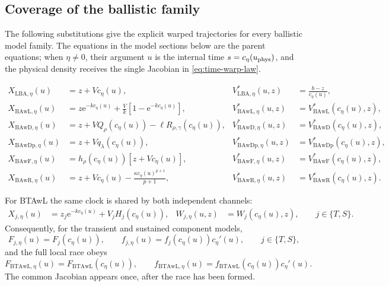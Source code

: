 \documentclass[12pt]{article}
\newcommand{\e}{\mathrm{e}}
\theoremstyle{remark}
\begin{document}
\subsection{Coverage of the ballistic family}
The following substitutions give the explicit warped trajectories for every ballistic model family. The equations in the model sections below are the parent equations; when \(\eta\ne0\), their argument \(u\) is the internal time \(s=c_\eta(u_{\rm phys})\), and the physical density receives the single Jacobian in \eqref{eq:time-warp-law}.

\begin{align}
 X_{\mathrm{LBA},\eta}(u)&=z+V c_\eta(u),
 &V_{\mathrm{LBA},\eta}^*(u,z)&=\frac{b-z}{c_\eta(u)},
 \label{eq:time-warp-lba}\\
 X_{\mathrm{BAwL},\eta}(u)&=z\e^{-kc_\eta(u)}
       +\frac{V}{k}\left[1-\e^{-kc_\eta(u)}\right],
 &V_{\mathrm{BAwL},\eta}^*(u,z)&=
       V_{\mathrm{BAwL}}^*(c_\eta(u),z),
 \label{eq:time-warp-bawl}\\
 X_{\mathrm{BAwD},\eta}(u)&=z+VQ_\rho(c_\eta(u))
       -\ell R_{\rho,\gamma}(c_\eta(u)),
 &V_{\mathrm{BAwD},\eta}^*(u,z)&=
       V_{\mathrm{BAwD}}^*(c_\eta(u),z),
 \label{eq:time-warp-bawd}\\
 X_{\mathrm{BAwDp},\eta}(u)&=z+Vq_\lambda(c_\eta(u)),
 &V_{\mathrm{BAwDp},\eta}^*(u,z)&=
       V_{\mathrm{BAwDp}}^*(c_\eta(u),z),
 \label{eq:time-warp-bawdp}\\
 X_{\mathrm{BAwF},\eta}(u)&=h_\rho(c_\eta(u))
       \left[z+Vc_\eta(u)\right],
 &V_{\mathrm{BAwF},\eta}^*(u,z)&=
       V_{\mathrm{BAwF}}^*(c_\eta(u),z),
 \label{eq:time-warp-bawf}\\
 X_{\mathrm{BAwR},\eta}(u)&=z+Vc_\eta(u)
       -\frac{\kappa c_\eta(u)^{p+1}}{p+1},
 &V_{\mathrm{BAwR},\eta}^*(u,z)&=
       V_{\mathrm{BAwR}}^*(c_\eta(u),z).
 \label{eq:time-warp-bawr}
\end{align}

For BTAwL the same clock is shared by both independent channels:
\begin{align}
 X_{j,\eta}(u)&=z_j\e^{-kc_\eta(u)}+V_jH_j(c_\eta(u)),
 &W_{j,\eta}(u,z)&=W_j(c_\eta(u),z),
 \qquad j\in\{T,S\}.
 \label{eq:time-warp-btawl}
\end{align}
Consequently, for the transient and sustained component models,
\begin{equation}
  F_{j,\eta}(u)=F_j(c_\eta(u)),
  \qquad
  f_{j,\eta}(u)=f_j(c_\eta(u))c_\eta'(u),
  \qquad j\in\{T,S\},
  \label{eq:time-warp-btawl-components}
\end{equation}
and the full local race obeys
\begin{equation}
  F_{\mathrm{BTAwL},\eta}(u)=F_{\mathrm{BTAwL}}(c_\eta(u)),
  \qquad
  f_{\mathrm{BTAwL},\eta}(u)=
       f_{\mathrm{BTAwL}}(c_\eta(u))c_\eta'(u).
  \label{eq:time-warp-btawl-race}
\end{equation}
The common Jacobian appears once, after the race has been formed.
\end{document}
